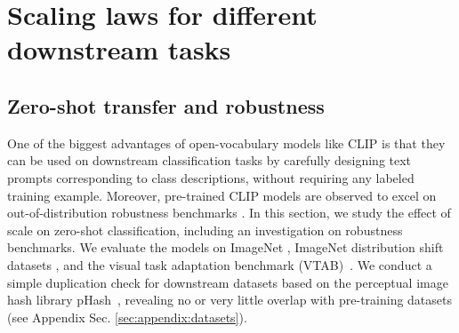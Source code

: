 \documentclass[11pt,table]{article}
\newcommand{\citep}{\cite}
\begin{document}



\section{Scaling laws for different downstream tasks}
\label{subsect:scaling_laws}

\subsection{Zero-shot transfer and robustness}
\label{subsect:scaling_laws_zeroshot_transfer}

One of the biggest advantages of open-vocabulary models like CLIP is that they can be used on downstream classification tasks by carefully designing text prompts corresponding to class descriptions, without requiring any labeled training example. Moreover, pre-trained CLIP models are observed to excel on out-of-distribution robustness benchmarks \citep{radford2021learning,miller2021accuracy}. In this section, we study the effect of scale on zero-shot classification, including an investigation on robustness benchmarks. We evaluate the models on ImageNet \citep{Deng2009a}, ImageNet distribution shift datasets \citep{imagenetr,imagenetc,imageneta,imagenetsketch,objectnet}, and the visual task adaptation benchmark (VTAB)~\cite{zhai2019large}. We conduct a simple duplication check for downstream datasets based on the perceptual image hash library pHash~\cite{zauner2010implementation}, revealing no or very little overlap with pre-training datasets (see Appendix Sec. \ref{sec:appendix:datasets}).
\end{document}
